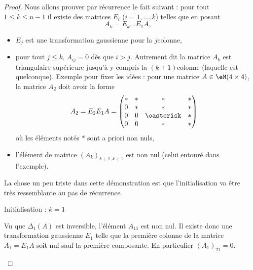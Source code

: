 \begin{proof}
    Nous allons prouver par récurrence le fait suivant : pour tout \( 1\leq k\leq n-1\) il existe des matrices  \( E_i\) ($i=1,\ldots, k$) telles que en posant
    \begin{equation}
        A_k=E_{k}\ldots E_1A,
    \end{equation}
    \begin{itemize}
        \item \( E_j\) est une transformation gaussienne pour la \( j\)\ieme colonne,
        \item pour tout \( j\leq k\), \( A_{ij}=0\) dès que \( i>j\). Autrement dit la matrice \( A_k\) est triangulaire supérieure jusqu'à y compris la \( (k+1)\)\ieme colonne (laquelle est quelconque). Exemple pour fixer les idées : pour une matrice \( A\in \eM(4\times 4) \), la matrice \( A_2\) doit avoir la forme
            \begin{equation}
                A_2=E_2E_1A=\begin{pmatrix}
                     *   &   *    &   *    &   *    \\
                     0   &   *    &   *    &   *    \\
                     0   &   0    &   \oasterisk    &   *    \\ 
                     0   &   0    &   *    &   *     
                 \end{pmatrix}
            \end{equation}
            où les éléments notés \(*\) sont a priori non nuls,
        \item l'élément de matrice \( (A_k)_{ k+1,k+1  }  \) est non nul (celui entouré dans l'exemple).
    \end{itemize}
    
    La chose un peu triste dans cette démonstration est que l'initialisation va être très ressemblante au pas de récurrence.
    \begin{subproof}
        \item[Initialisation : \( k=1\)]

            Vu que \( \Delta_1(A)\) est inversible, l'élément \( A_{11}\) est non nul. Il existe donc une transformation gaussienne \( E_1\) telle que la première colonne de la matrice \( A_1=E_1A\) soit nul sauf la première composante. En particulier \( (A_1)_{21}=0\).


\end{subproof}
\end{proof}
